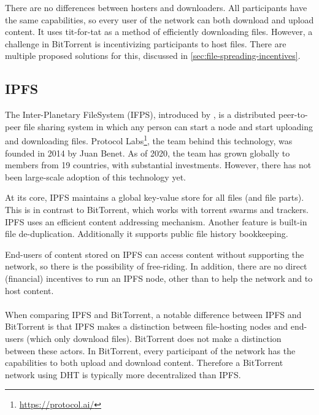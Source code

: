 
There are no differences between hosters and downloaders. All participants have the same capabilities, so every user of the network can both download and upload content. It uses tit-for-tat as a method of efficiently downloading files. However, a challenge in BitTorrent is incentivizing participants to host files. There are multiple proposed solutions for this, discussed in \ref{sec:file-spreading-incentives}. 
\subsection{IPFS}
The Inter-Planetary FileSystem (IFPS), introduced by \cite{benet2014ipfs}, is a distributed peer-to-peer file sharing system in which any person can start a node and start uploading and downloading files. Protocol Labs\footnote{\url{https://protocol.ai/}}, the team behind this technology, was founded in 2014 by Juan Benet. As of 2020, the team has grown globally to members from 19 countries, with substantial investments. However, there has not been large-scale adoption of this technology yet.


At its core, IPFS maintains a global key-value store for all files (and file parts). This is in contrast to BitTorrent, which works with torrent swarms and trackers. IPFS uses an efficient content addressing mechanism. Another feature is built-in file de-duplication. Additionally it supports public file history bookkeeping.

End-users of content stored on IPFS can access content without supporting the network, so there is the possibility of free-riding. In addition, there are no direct (financial) incentives to run an IPFS node, other than to help the network and to host content. 
\\
\\
When comparing IPFS and BitTorrent, a notable difference between IPFS and BitTorrent is that IPFS makes a distinction between file-hosting nodes and end-users (which only download files). BitTorrent does not make a distinction between these actors. In BitTorrent, every participant of the network has the capabilities to both upload and download content. Therefore a BitTorrent network using DHT is typically more decentralized than IPFS. 

